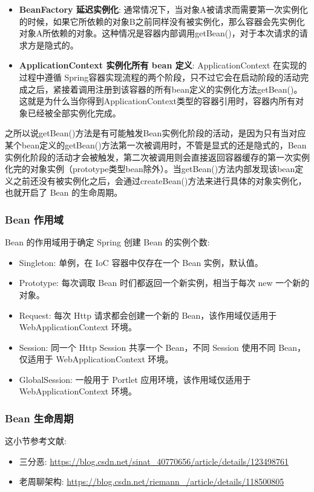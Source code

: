 \begin{itemize}
    \item \textbf{BeanFactory 延迟实例化}: 通常情况下，当对象A被请求而需要第一次实例化的时候，如果它所依赖的对象B之前同样没有被实例化，那么容器会先实例化对象A所依赖的对象。这种情况是容器内部调用getBean()，对于本次请求的请求方是隐式的。
    \item \textbf{ApplicationContext 实例化所有 bean 定义}: ApplicationContext 在实现的过程中遵循 Spring容器实现流程的两个阶段，只不过它会在启动阶段的活动完成之后，紧接着调用注册到该容器的所有bean定义的实例化方法getBean()。这就是为什么当你得到ApplicationContext类型的容器引用时，容器内所有对象已经被全部实例化完成。
\end{itemize}

之所以说getBean()方法是有可能触发Bean实例化阶段的活动，是因为只有当对应某个bean定义的getBean()方法第一次被调用时，不管是显式的还是隐式的，Bean实例化阶段的活动才会被触发，第二次被调用则会直接返回容器缓存的第一次实例化完的对象实例（prototype类型bean除外）。当getBean()方法内部发现该bean定义之前还没有被实例化之后，会通过createBean()方法来进行具体的对象实例化，也就开启了 Bean 的生命周期。

\subsubsection{Bean 作用域}

Bean 的作用域用于确定 Spring 创建 Bean 的实例个数:
\begin{itemize}
    \item Singleton: 单例，在 IoC 容器中仅存在一个 Bean 实例，默认值。
    \item Prototype: 每次调取 Bean 时们都返回一个新实例，相当于每次 new 一个新的对象。
    \item Request: 每次 Http 请求都会创建一个新的 Bean，该作用域仅适用于 WebApplicationContext 环境。
    \item Session: 同一个 Http Session 共享一个 Bean，不同 Session 使用不同 Bean，仅适用于 WebApplicationContext 环境。
    \item GlobalSession: 一般用于 Portlet 应用环境，该作用域仅适用于 WebApplicationContext 环境。
\end{itemize}

\subsubsection{Bean 生命周期}

这小节参考文献:
\begin{itemize}
    \item 三分恶: \url{https://blog.csdn.net/sinat_40770656/article/details/123498761}
    \item 老周聊架构: \url{https://blog.csdn.net/riemann_/article/details/118500805}
\end{itemize}

